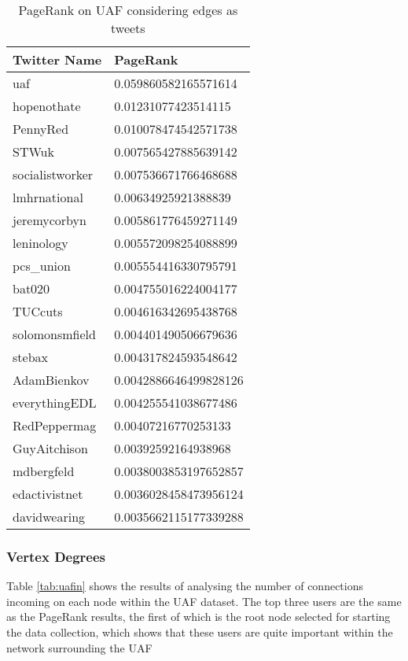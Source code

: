 \begin{table}%
\centering
\begin{tabular}{|l|l|}
\hline
Twitter Name & PageRank \\
\hline
uaf & 0.059860582165571614 \\
hopenothate & 0.01231077423514115 \\
PennyRed & 0.010078474542571738 \\
STWuk & 0.007565427885639142 \\
socialistworker & 0.007536671766468688 \\
lmhrnational & 0.00634925921388839 \\
jeremycorbyn & 0.005861776459271149 \\
leninology & 0.005572098254088899 \\
pcs\_union & 0.005554416330795791 \\
bat020 & 0.004755016224004177 \\
TUCcuts & 0.004616342695438768 \\
solomonsmfield & 0.004401490506679636 \\
stebax & 0.004317824593548642 \\
AdamBienkov & 0.0042886646499828126 \\
everythingEDL & 0.004255541038677486 \\
RedPeppermag & 0.00407216770253133 \\
GuyAitchison & 0.00392592164938968 \\
mdbergfeld & 0.0038003853197652857 \\
edactivistnet & 0.0036028458473956124 \\
davidwearing & 0.0035662115177339288 \\
\hline
\end{tabular}
\caption{PageRank on UAF considering edges as tweets}
\label{tab:uaftweetpagerank}
\end{table}

\subsubsection{Vertex Degrees}
Table \ref{tab:uafin} shows the results of analysing the number of connections incoming on each node within the UAF dataset. The top three users are the same as the PageRank results, the first of which is the root node selected for starting the data collection, which shows that these users are quite important within the network surrounding the UAF

